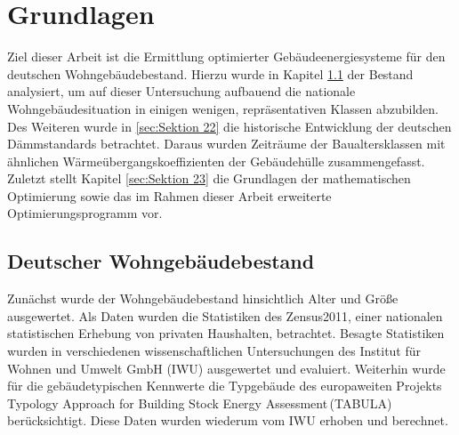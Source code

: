 \chapter{Grundlagen}

Ziel dieser Arbeit ist die Ermittlung optimierter Gebäudeenergiesysteme für den deutschen Wohngebäudebestand.
Hierzu wurde in Kapitel \ref{sec:Sektion 21} der Bestand analysiert, um auf dieser Untersuchung aufbauend die nationale Wohngebäudesituation in einigen wenigen, repräsentativen Klassen abzubilden. 
Des Weiteren wurde in \ref{sec:Sektion 22} die historische Entwicklung der deutschen Dämmstandards betrachtet. Daraus wurden Zeiträume der Baualtersklassen mit ähnlichen Wärmeübergangskoeffizienten der Gebäudehülle zusammengefasst. 
Zuletzt stellt Kapitel \ref{sec:Sektion 23} die Grundlagen der mathematischen Optimierung sowie das im Rahmen dieser Arbeit erweiterte Optimierungsprogramm vor. 







\section{Deutscher Wohngebäudebestand}
\label{sec:Sektion 21}

Zunächst wurde der Wohngebäudebestand hinsichtlich Alter und Größe ausgewertet.
Als Daten wurden die Statistiken des Zensus2011, einer nationalen statistischen Erhebung von privaten Haushalten, betrachtet. 
Besagte Statistiken wurden in verschiedenen wissenschaftlichen Untersuchungen des Institut für Wohnen und Umwelt GmbH (IWU) ausgewertet und evaluiert.
Weiterhin wurde für die gebäudetypischen Kennwerte die Typgebäude des europaweiten Projekts \glqq Typology Approach for Building Stock Energy Assessment\grqq\,(TABULA) berücksichtigt. Diese Daten wurden wiederum vom IWU erhoben und berechnet.

